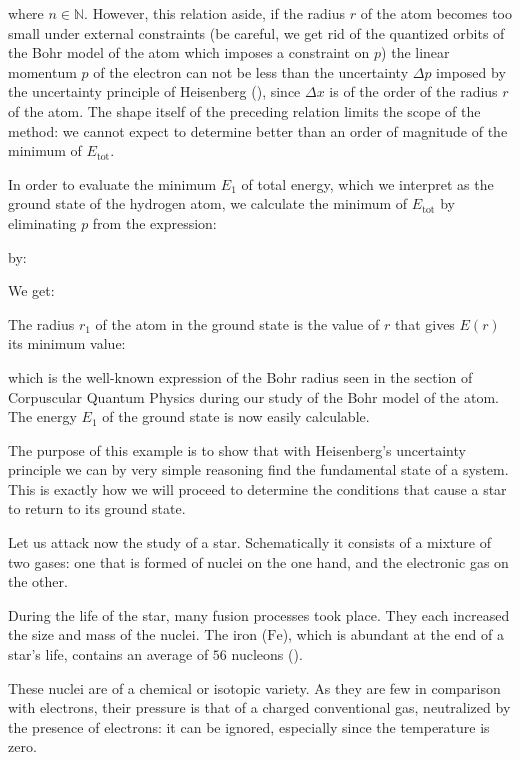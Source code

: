 	where $n\in \mathbb{N}$. However, this relation aside, if the radius $r$ of the atom becomes too small under external constraints (be careful, we get rid of the quantized orbits of the Bohr model of the atom which imposes a constraint on $p$) the linear momentum $p$ of the electron can not be less than the uncertainty $\Delta p$ imposed by the uncertainty principle of Heisenberg (), since $\Delta x$ is of the order of the radius $r$ of the atom. The shape itself of the preceding relation limits the scope of the method: we cannot expect to determine better than an order of magnitude of the minimum of $E_\text{tot}$.
	
	In order to evaluate the minimum $E_1$ of total energy, which we interpret as the ground state of the hydrogen atom, we calculate the minimum of $E_\text{tot}$ by eliminating $p$ from the expression:
	
	by:
	
	We get:
	
	The radius $r_1$ of the atom in the ground state is the value of $r$ that gives $E(r)$ its minimum value:
	
	which is the well-known expression of the Bohr radius seen in the section of Corpuscular Quantum Physics during our study of the Bohr model of the atom. The energy $E_1$ of the ground state is now easily calculable.
	
	The purpose of this example is to show that with Heisenberg's uncertainty principle we can by very simple reasoning find the fundamental state of a system. This is exactly how we will proceed to determine the conditions that cause a star to return to its ground state.
	
	Let us attack now the study of a star. Schematically it consists of a mixture of two gases: one that is formed of nuclei on the one hand, and the electronic gas on the other.
	
	During the life of the star, many fusion processes took place. They each increased the size and mass of the nuclei. The iron ($\mathrm{Fe}$), which is abundant at the end of a star's life, contains an average of $56$ nucleons ().
	
	These nuclei are of a chemical or isotopic variety. As they are few in comparison with electrons, their pressure is that of a charged conventional gas, neutralized by the presence of electrons: it can be ignored, especially since the temperature is zero.

